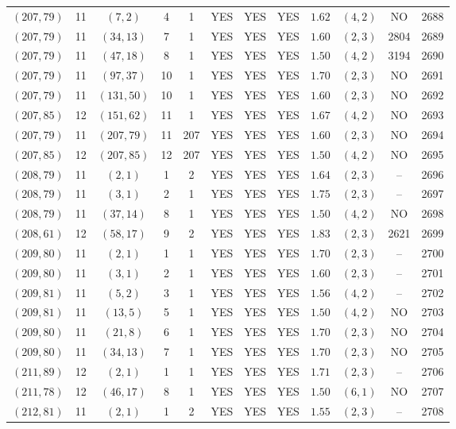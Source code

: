\begin{longtable}{|c|c|c|c|c|c|c|c|c|c|c|c|}
$(207,79)$ & 11 & $(7,2)$ & 4 & 1 & YES & YES & YES & $1.62$ & $(4,2)$ & NO & 2688\\
$(207,79)$ & 11 & $(34,13)$ & 7 & 1 & YES & YES & YES & $1.60$ & $(2,3)$ & 2804 & 2689\\
$(207,79)$ & 11 & $(47,18)$ & 8 & 1 & YES & YES & YES & $1.50$ & $(4,2)$ & 3194 & 2690\\
$(207,79)$ & 11 & $(97,37)$ & 10 & 1 & YES & YES & YES & $1.70$ & $(2,3)$ & NO & 2691\\
$(207,79)$ & 11 & $(131,50)$ & 10 & 1 & YES & YES & YES & $1.60$ & $(2,3)$ & NO & 2692\\
$(207,85)$ & 12 & $(151,62)$ & 11 & 1 & YES & YES & YES & $1.67$ & $(4,2)$ & NO & 2693\\
$(207,79)$ & 11 & $(207,79)$ & 11 & 207 & YES & YES & YES & $1.60$ & $(2,3)$ & NO & 2694\\
$(207,85)$ & 12 & $(207,85)$ & 12 & 207 & YES & YES & YES & $1.50$ & $(4,2)$ & NO & 2695\\
$(208,79)$ & 11 & $(2,1)$ & 1 & 2 & YES & YES & YES & $1.64$ & $(2,3)$ & -- & 2696\\
$(208,79)$ & 11 & $(3,1)$ & 2 & 1 & YES & YES & YES & $1.75$ & $(2,3)$ & -- & 2697\\
$(208,79)$ & 11 & $(37,14)$ & 8 & 1 & YES & YES & YES & $1.50$ & $(4,2)$ & NO & 2698\\
$(208,61)$ & 12 & $(58,17)$ & 9 & 2 & YES & YES & YES & $1.83$ & $(2,3)$ & 2621 & 2699\\
$(209,80)$ & 11 & $(2,1)$ & 1 & 1 & YES & YES & YES & $1.70$ & $(2,3)$ & -- & 2700\\
$(209,80)$ & 11 & $(3,1)$ & 2 & 1 & YES & YES & YES & $1.60$ & $(2,3)$ & -- & 2701\\
$(209,81)$ & 11 & $(5,2)$ & 3 & 1 & YES & YES & YES & $1.56$ & $(4,2)$ & -- & 2702\\
$(209,81)$ & 11 & $(13,5)$ & 5 & 1 & YES & YES & YES & $1.50$ & $(4,2)$ & NO & 2703\\
$(209,80)$ & 11 & $(21,8)$ & 6 & 1 & YES & YES & YES & $1.70$ & $(2,3)$ & NO & 2704\\
$(209,80)$ & 11 & $(34,13)$ & 7 & 1 & YES & YES & YES & $1.70$ & $(2,3)$ & NO & 2705\\
$(211,89)$ & 12 & $(2,1)$ & 1 & 1 & YES & YES & YES & $1.71$ & $(2,3)$ & -- & 2706\\
$(211,78)$ & 12 & $(46,17)$ & 8 & 1 & YES & YES & YES & $1.50$ & $(6,1)$ & NO & 2707\\
$(212,81)$ & 11 & $(2,1)$ & 1 & 2 & YES & YES & YES & $1.55$ & $(2,3)$ & -- & 2708\\

\end{longtable}
